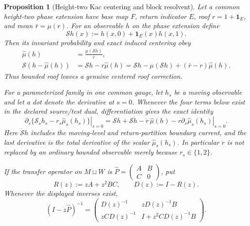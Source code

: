 \documentclass[11pt]{article}
\newtheorem{proposition}[theorem]{Proposition}
\newcommand{\one}{\mathbf 1}
\begin{document}
\begin{proposition}[Height-two Kac centering and block resolvent]
\label{prop:height-two-kac-block-resolvent}
Let a common height-two phase extension have base map $F$, return indicator
$E$, roof $r=1+\one_E$, and mean $\bar r=\mu(r)$.  For an observable $h$ on
the phase extension define
\begin{equation}
\label{eq:height-two-induced-observable}
 \mathcal S h(x):=h(x,0)+\one_E(x)h(x,1).
\end{equation}
Then its invariant probability and exact induced centering obey
\begin{align}
 \widehat\mu(h)&=\frac{\mu(\mathcal S h)}{\bar r},
 \label{eq:height-two-kac-measure}\\
 \mathcal S(h-\widehat\mu(h))
 &=\mathcal S h-r\widehat\mu(h)
  =\mathcal S h-\mu(\mathcal S h)
    +(\bar r-r)\widehat\mu(h).
 \label{eq:height-two-centering-correction}
\end{align}
Thus bounded roof leaves a genuine centered roof correction.

For a parameterized family in one common gauge, let $h_s$ be a moving
observable and let a dot denote the derivative at $s=0$.  Whenever the four
terms below exist in the declared source/test dual, differentiation gives
the exact identity
\begin{equation}
\label{eq:height-two-differentiated-kac-observable}
 \left.\partial_s\{\mathcal S_sh_s
       -r_s\widehat\mu_s(h_s)\}\right|_{s=0}
 =\dot{\mathcal S}h+\mathcal S\dot h
  -\dot r\,\widehat\mu(h)
  -r\left.\partial_s\widehat\mu_s(h_s)\right|_{s=0}.
\end{equation}
Here $\dot{\mathcal S}h$ includes the moving-level and return-partition
boundary current, and the last derivative is the total derivative of the
scalar $\widehat\mu_s(h_s)$.  In particular $\dot r$ is not replaced by an
ordinary bounded observable merely because $r_s\in\{1,2\}$.

If the transfer operator on $M\sqcup W$ is
$\widehat P=\left(\begin{smallmatrix}A&B\\C&0\end{smallmatrix}\right)$, put
\begin{equation}
\label{eq:height-two-return-polynomial}
 R(z):=zA+z^2BC,\qquad D(z):=I-R(z).
\end{equation}
Whenever the displayed inverses exist,
\begin{equation}
\label{eq:height-two-block-resolvent}
 (I-z\widehat P)^{-1}
 =\begin{pmatrix}
 D(z)^{-1}&zD(z)^{-1}B\\
 zCD(z)^{-1}&I+z^2CD(z)^{-1}B
 \end{pmatrix}.
\end{equation}
\end{proposition}
\end{document}
